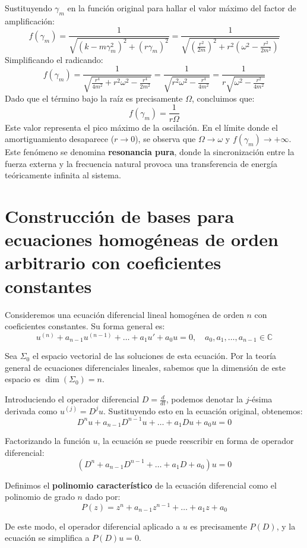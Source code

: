 Sustituyendo $\gamma_m$ en la función original para hallar el valor máximo del factor de amplificación:
\[ f(\gamma_m) = \frac{1}{\sqrt{(k - m \gamma_m^2)^2 + (r \gamma_m)^2}} = \frac{1}{\sqrt{\left(\frac{r^2}{2m}\right)^2 + r^2 \left(\omega^2 - \frac{r^2}{2m^2}\right)}} \]
Simplificando el radicando:
\[ f(\gamma_m) = \frac{1}{\sqrt{\frac{r^4}{4m^2} + r^2 \omega^2 - \frac{r^4}{2m^2}}} = \frac{1}{\sqrt{r^2 \omega^2 - \frac{r^4}{4m^2}}} = \frac{1}{r \sqrt{\omega^2 - \frac{r^2}{4m^2}}} \]
Dado que el término bajo la raíz es precisamente $\Omega$, concluimos que:
\[ f(\gamma_m) = \frac{1}{r \Omega} \]
Este valor representa el pico máximo de la oscilación. En el límite donde el amortiguamiento desaparece ($r \to 0$), se observa que $\Omega \to \omega$ y $f(\gamma_m) \to +\infty$. Este fenómeno se denomina \textbf{resonancia pura}, donde la sincronización entre la fuerza externa y la frecuencia natural provoca una transferencia de energía teóricamente infinita al sistema.


\section{Construcción de bases para ecuaciones homogéneas de orden arbitrario con coeficientes constantes}

Consideremos una ecuación diferencial lineal homogénea de orden $n$ con coeficientes constantes. Su forma general es:
\[
    u^{(n)} + a_{n-1} u^{(n-1)} + \dots + a_1 u' + a_0 u = 0, \quad a_0, a_1, \dots, a_{n-1} \in \mathbb{C}
\]

Sea $\Sigma_0$ el espacio vectorial de las soluciones de esta ecuación. Por la teoría general de ecuaciones diferenciales lineales, sabemos que la dimensión de este espacio es $\dim(\Sigma_0) = n$. 

Introduciendo el operador diferencial $D = \frac{d}{dt}$, podemos denotar la $j$-ésima derivada como $u^{(j)} = D^j u$. Sustituyendo esto en la ecuación original, obtenemos:
\[
    D^n u + a_{n-1} D^{n-1} u + \dots + a_1 D u + a_0 u = 0
\]

Factorizando la función $u$, la ecuación se puede reescribir en forma de operador diferencial:
\[
    (D^n + a_{n-1} D^{n-1} + \dots + a_1 D + a_0) u = 0
\]

Definimos el \textbf{polinomio característico} de la ecuación diferencial como el polinomio de grado $n$ dado por:
\[
    P(z) = z^n + a_{n-1} z^{n-1} + \dots + a_1 z + a_0
\]

De este modo, el operador diferencial aplicado a $u$ es precisamente $P(D)$, y la ecuación se simplifica a $P(D)u = 0$.

